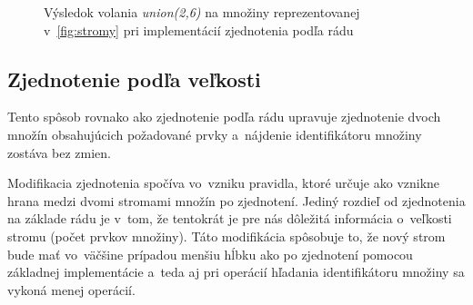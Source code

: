 \begin{figure}[H]
    \centering
    \captionsetup{justification=centering}
         
    \caption{Výsledok volania \emph{union(2,6)} na množiny reprezentovanej v~\ref{fig:stromy} pri implementácií zjednotenia podľa rádu}
    \label{fig:priklad_zjednotenie_podľa_rádu}
\end{figure}

\subsection{Zjednotenie podľa veľkosti}

Tento spôsob rovnako ako zjednotenie podľa rádu upravuje zjednotenie dvoch množín obsahujúcich požadované prvky a~nájdenie identifikátoru množiny zostáva bez zmien.

Modifikacia zjednotenia spočíva vo~vzniku pravidla, ktoré určuje ako vznikne hrana medzi dvomi stromami množín po zjednotení. Jediný rozdieľ od zjednotenia na základe rádu je v~tom, že tentokrát je pre nás dôležitá informácia o~veľkosti stromu (počet prvkov množiny). Táto modifikácia spôsobuje to, že nový strom bude mať vo~väčšine prípadou menšiu hĺbku ako po zjednotení pomocou základnej implementácie a~teda aj pri operácií hľadania identifikátoru množiny sa vykoná menej operácií.

